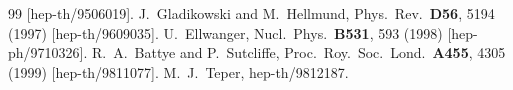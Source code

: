 \documentclass[a4paper,12pt]{article}
\begin{document}
\begin{thebibliography}{99}
[hep-th/9506019].
%
J.~Gladikowski and M.~Hellmund,
Phys.\ Rev.\  {\bf D56}, 5194 (1997)
[hep-th/9609035].
%
U.~Ellwanger,
Nucl.\ Phys.\  {\bf B531}, 593 (1998)
[hep-ph/9710326].
%
R.~A.~Battye and P.~Sutcliffe,
Proc.\ Roy.\ Soc.\ Lond.\  {\bf A455}, 4305 (1999)
[hep-th/9811077].
%
M.~J.~Teper,
hep-th/9812187.


\end{thebibliography}
\end{document}
